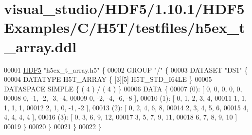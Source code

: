 \hypertarget{visual__studio_2_h_d_f5_21_810_81_2_h_d_f5_examples_2_c_2_h5_t_2testfiles_2h5ex__t__array_8ddl_source}{}\section{visual\+\_\+studio/\+H\+D\+F5/1.10.1/\+H\+D\+F5\+Examples/\+C/\+H5\+T/testfiles/h5ex\+\_\+t\+\_\+array.ddl}
\label{visual__studio_2_h_d_f5_21_810_81_2_h_d_f5_examples_2_c_2_h5_t_2testfiles_2h5ex__t__array_8ddl_source}

\begin{DoxyCode}
00001 \hyperlink{namespace_h_d_f5}{HDF5} \textcolor{stringliteral}{"h5ex\_t\_array.h5"} \{
00002 GROUP \textcolor{stringliteral}{"/"} \{
00003    DATASET \textcolor{stringliteral}{"DS1"} \{
00004       DATATYPE  H5T\_ARRAY \{ [3][5] H5T\_STD\_I64LE \}
00005       DATASPACE  SIMPLE \{ ( 4 ) / ( 4 ) \}
00006       DATA \{
00007       (0): [ 0, 0, 0, 0, 0,
00008             0, -1, -2, -3, -4,
00009             0, -2, -4, -6, -8 ],
00010       (1): [ 0, 1, 2, 3, 4,
00011             1, 1, 1, 1, 1,
00012             2, 1, 0, -1, -2 ],
00013       (2): [ 0, 2, 4, 6, 8,
00014             2, 3, 4, 5, 6,
00015             4, 4, 4, 4, 4 ],
00016       (3): [ 0, 3, 6, 9, 12,
00017             3, 5, 7, 9, 11,
00018             6, 7, 8, 9, 10 ]
00019       \}
00020    \}
00021 \}
00022 \}
\end{DoxyCode}
